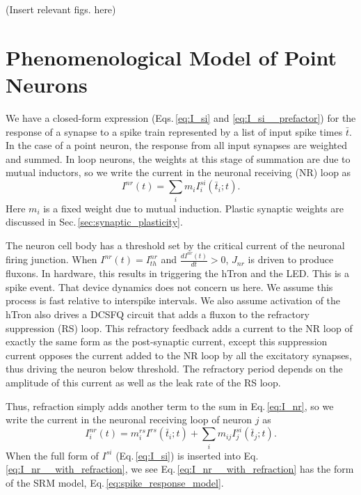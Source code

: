 \documentclass[]{article}
\begin{document}
(Insert relevant figs. here)

\section{\label{sec:neurons}Phenomenological Model of Point Neurons}
We have a closed-form expression (Eqs.\,\ref{eq:I_si} and \ref{eq:I_si__prefactor}) for the response of a synapse to a spike train represented by a list of input spike times $\bar{t}$. In the case of a point neuron, the response from all input synapses are weighted and summed. In loop neurons, the weights at this stage of summation are due to mutual inductors, so we write the current in the neuronal receiving (NR) loop as
\begin{equation}
\label{eq:I_nr}
I^{nr}(t) = \sum_i m_i I_i^{si}(\bar{t}_i;t).
\end{equation}
Here $m_i$ is a fixed weight due to mutual induction. Plastic synaptic weights are discussed in Sec.\,\ref{sec:synaptic_plasticity}. 

The neuron cell body has a threshold set by the critical current of the neuronal firing junction. When $I^{nr}(t) = I^{nr}_{th}$ and $\frac{dI^{nr}(t)}{dt} > 0$, $J_{nr}$ is driven to produce fluxons. In hardware, this results in triggering the hTron and the LED. This is a spike event. That device dynamics does not concern us here. We assume this process is fast relative to interspike intervals. We also assume activation of the hTron also drives a DCSFQ circuit that adds a fluxon to the refractory suppression (RS) loop. This refractory feedback adds a current to the NR loop of exactly the same form as the post-synaptic current, except this suppression current opposes the current added to the NR loop by all the excitatory synapses, thus driving the neuron below threshold. The refractory period depends on the amplitude of this current as well as the leak rate of the RS loop.

Thus, refraction simply adds another term to the sum in Eq.\,\ref{eq:I_nr}, so we write the current in the neuronal receiving loop of neuron $j$ as
\begin{equation}
\label{eq:I_nr__with_refraction}
I_i^{nr}(t) = m_i^{rs}I^{rs}(\bar{t}_i;t)+\sum_i m_{ij} I_j^{si}(\bar{t}_j;t).
\end{equation}
When the full form of $I^{si}$ (Eq.\,\ref{eq:I_si}) is inserted into Eq.\,\ref{eq:I_nr__with_refraction}, we see Eq.\,\ref{eq:I_nr__with_refraction} has the form of the SRM model, Eq.\,\ref{eq:spike_response_model}.
\end{document}
